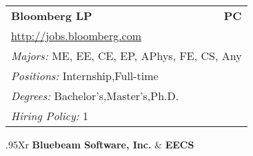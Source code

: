 \documentclass[twoside]{article}
\begin{document}
\begin{center}
\begin{multicols}{3}
\begin{FlushLeft}
\begin{minipage}{.9\columnwidth}
\end{minipage}
 
\begin{minipage}{.9\columnwidth}\begin{tabularx}{.95\columnwidth}{Xr}
                 {\Large\bf Bloomberg LP} & {\Large\bf PC}\\
    \multicolumn{2}{p{.95\columnwidth}}{\url{http://jobs.bloomberg.com}}\\
    \multicolumn{2}{p{.95\columnwidth}}{\emph{Majors:} ME, EE, CE, EP, APhys, FE, CS, Any}\\
    \multicolumn{2}{p{.95\columnwidth}}{\emph{Positions:} Internship,Full-time}\\
    \multicolumn{2}{p{.95\columnwidth}}{\emph{Degrees:} Bachelor's,Master's,Ph.D.}\\
    \multicolumn{2}{p{.95\columnwidth}}{\emph{Hiring Policy:} 1}\\
    \end{tabularx}
    
\end{minipage}
 
\begin{minipage}{.9\columnwidth}\begin{tabularx}{.95\columnwidth}{Xr}
                 {\Large\bf Bluebeam Software, Inc.} & {\Large\bf EECS}\\
    \\
    \\
    \\
    \\
    \\
    \end{tabularx}
    
\end{minipage}
 

\end{FlushLeft}
\end{multicols}
\end{center}
\end{document}
